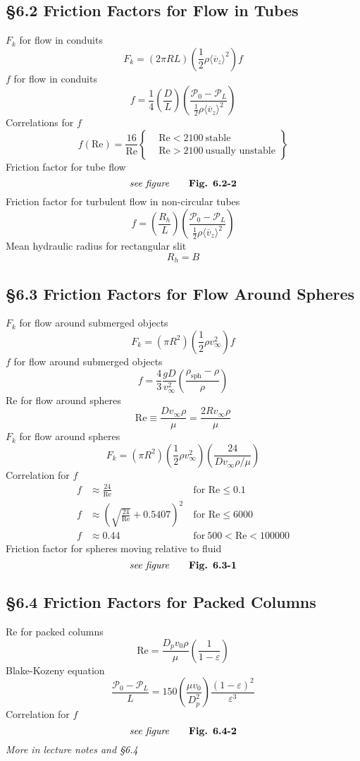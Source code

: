 \subsection{\S6.2 Friction Factors for Flow in Tubes}
$F_k$ for flow in conduits
\[
	F_k=(2\pi RL)\left(\frac{1}{2}\rho\langle\overline{v}_z\rangle^2\right)f\tag{6.1-2}
\]
$f$ for flow in conduits
\[
	f=\frac{1}{4}\left(\frac{D}{L}\right)\left(\frac{\mathscr{P}_0-\mathscr{P}_L}{\frac{1}{2}\rho\langle\overline{v}_z\rangle^2}\right)\tag{6.1-4}
\]
Correlations for $f$
\[
	f(\text{Re})=\frac{16}{\text{Re}}\left\{\begin{aligned}&\text{Re}<2100 \ \text{stable}\\&\text{Re}>2100 \ \text{usually unstable}\end{aligned}\right\}\tag{6.2-11}
\]
Friction factor for tube flow
\[
	\textit{see figure}\tag*{\textbf{Fig. 6.2-2}}
\]
Friction factor for turbulent flow in non-circular tubes
\[
	f=\left(\frac{R_h}{L}\right)\left(\frac{\mathscr{P}_0-\mathscr{P}_L}{\frac{1}{2}\rho\langle\overline{v}_z\rangle^2}\right)\tag{6.2-16}
\]
Mean hydraulic radius for rectangular slit
\[
	R_h=B\tag{Lecture notes 9.6}
\]
\subsection{\S6.3 Friction Factors for Flow Around Spheres}
$F_k$ for flow around submerged objects
\[
	F_k=(\pi R^2)\left(\frac{1}{2}\rho v_\infty^2\right)f\tag{6.1-5}
\]
$f$ for flow around submerged objects
\[
	f=\frac{4}{3}\frac{gD}{v_\infty^2}\left(\frac{\rho_\text{sph}-\rho}{\rho}\right)\tag{6.1-7}
\]
Re for flow around spheres
\[
	\text{Re}\equiv\frac{Dv_\infty\rho}{\mu}=\frac{2Rv_\infty\rho}{\mu}\tag{6.3-8}
\]
$F_k$ for flow around spheres
\[
	F_k=(\pi R^2)\left(\frac{1}{2}\rho v_\infty^2\right)\left(\frac{24}{Dv_\infty\rho/\mu}\right)\tag{6.3-14}
\]
Correlation for $f$
\begin{align}
	f & \approx\frac{24}{\text{Re}} \                               & \text{for Re}\leq0.1\tag{6.3-15}              \\
	f & \approx\left(\sqrt{\frac{24}{\text{Re}}}+0.5407\right)^2 \  & \text{for Re}\leq6000\tag{6.3-16}             \\
	f & \approx0.44 \                                               & \text{for} \ 500<\text{Re}<100000\tag{6.3-17}
\end{align}
Friction factor for spheres moving relative to fluid
\[
	\textit{see figure}\tag*{\textbf{Fig. 6.3-1}}
\]
\subsection{\S6.4 Friction Factors for Packed Columns}
Re for packed columns
\[
	\text{Re}=\frac{D_pv_0\rho}{\mu}\left(\frac{1}{1-\varepsilon}\right)\tag{Lecture notes 9.20}
\]
Blake-Kozeny equation
\[
	\frac{\mathscr{P}_0-\mathscr{P}_L}{L}=150\left(\frac{\mu v_0}{D_p^2}\right)\frac{(1-\varepsilon)^2}{\varepsilon^3}\tag{6.4-9}
\]
Correlation for $f$
\[
	\textit{see figure}\tag*{\textbf{Fig. 6.4-2}}
\]
\textit{More in lecture notes and \S6.4}
